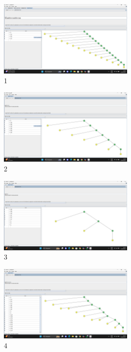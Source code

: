 \documentclass[a4paper,12pt]{article}
\begin{document}
    \begin{figure}[H]
        \centering
        \includegraphics[width=0.6\textwidth]{Aula03/Daniel/1.png}
        \caption*{1}
    \end{figure}
    \begin{figure}[H]
        \centering
        \includegraphics[width=0.6\textwidth]{Aula03/Daniel/2.png}
        \caption*{2}
    \end{figure}
    \begin{figure}[H]
        \centering
        \includegraphics[width=0.6\textwidth]{Aula03/Daniel/3.png}
        \caption*{3}
    \end{figure}
    \begin{figure}[H]
        \centering
        \includegraphics[width=0.6\textwidth]{Aula03/Daniel/4.png}
        \caption*{4}
    \end{figure}
\end{document}
